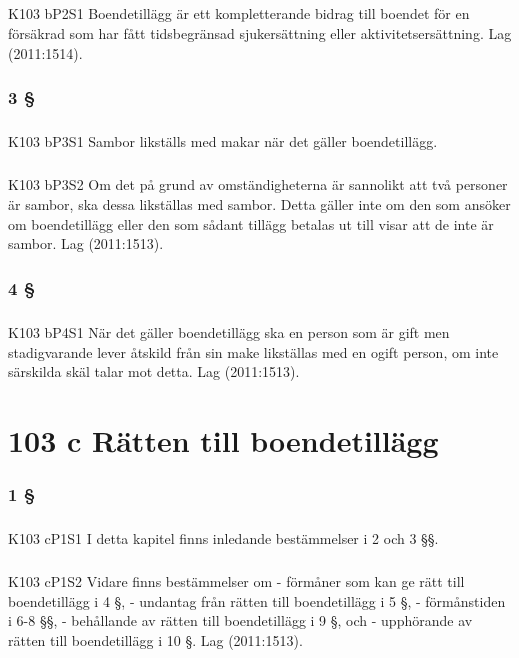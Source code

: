 \documentclass[a4paper,notitlepage,openany,10pt]{book}
\begin{document}
\paragraph*{}
{\tiny K103 bP2S1}
Boendetillägg är ett kompletterande bidrag till boendet för en försäkrad som har fått tidsbegränsad sjukersättning eller aktivitetsersättning.
Lag (2011:1514).
\subsection*{3 §}
\paragraph*{}
{\tiny K103 bP3S1}
Sambor likställs med makar när det gäller boendetillägg.
\paragraph*{}
{\tiny K103 bP3S2}
Om det på grund av omständigheterna är sannolikt att två personer är sambor, ska dessa likställas med sambor. Detta gäller inte om den som ansöker om boendetillägg eller den som sådant tillägg betalas ut till visar att de inte är sambor.
Lag (2011:1513).
\subsection*{4 §}
\paragraph*{}
{\tiny K103 bP4S1}
När det gäller boendetillägg ska en person som är gift men stadigvarande lever åtskild från sin make likställas med en ogift person, om inte särskilda skäl talar mot detta.
Lag (2011:1513).
\chapter*{103 c Rätten till boendetillägg}
\subsection*{1 §}
\paragraph*{}
{\tiny K103 cP1S1}
I detta kapitel finns inledande bestämmelser i 2 och 3 §§.
\paragraph*{}
{\tiny K103 cP1S2}
Vidare finns bestämmelser om
\newline - förmåner som kan ge rätt till boendetillägg i 4 §,
\newline - undantag från rätten till boendetillägg i 5 §,
\newline - förmånstiden i 6-8 §§,
\newline - behållande av rätten till boendetillägg i 9 §, och
\newline - upphörande av rätten till boendetillägg i 10 §.
Lag (2011:1513).
\end{document}
